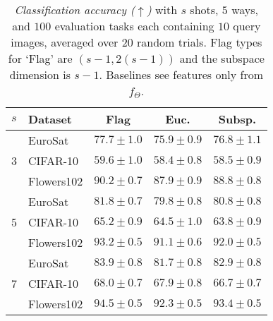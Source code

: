 \setlength{\tabcolsep}{10pt}
\begin{table}[ht]
    \centering
    \caption{\emph{Classification accuracy ($\uparrow$)} with $s$ shots, $5$ ways, and $100$ evaluation tasks each containing $10$ query images, averaged over $20$ random trials. Flag types for `Flag' are $(s-1,2(s-1))$ and the subspace dimension is $s-1$. Baselines see features only from $f_\Theta$.}
    \label{tab:fewshot_app2}
    \begin{tabular}{@{\hskip 4pt}l@{\hskip 4pt}l@{\hskip 4pt}c@{\hskip 7pt} c @{\hskip 7pt}c}
        \toprule
        $s$ & Dataset & Flag & Euc. & Subsp. \\
        \midrule
        \multirow{3}{*}{3} & EuroSat & $\bm{77.7} \pm 1.0$ & $75.9 \pm 0.9$ & $76.8 \pm 1.1$ \\
         & CIFAR-10 & $\bm{59.6} \pm 1.0$ & $58.4 \pm 0.8$ & $58.5 \pm 0.9$ \\
         & Flowers102 & $\bm{90.2} \pm 0.7$ & $87.9 \pm 0.9$ & $88.8 \pm 0.8$ \\
        \cline{1-5}
        \multirow{3}{*}{5} & EuroSat & $\bm{81.8} \pm 0.7$ & $79.8 \pm 0.8$ & $80.8 \pm 0.8$ \\
         & CIFAR-10 & $\bm{65.2} \pm 0.9$ & $64.5 \pm 1.0$ & $63.8 \pm 0.9$ \\
         & Flowers102 & $\bm{93.2} \pm 0.5$ & $91.1 \pm 0.6$ & $92.0 \pm 0.5$ \\
        \cline{1-5}
        \multirow{3}{*}{7} & EuroSat & $\bm{83.9} \pm 0.8$ & $81.7 \pm 0.8$ & $82.9 \pm 0.8$ \\
         & CIFAR-10 & $\bm{68.0} \pm 0.7$ & $67.9 \pm 0.8$ & $66.7 \pm 0.7$ \\
         & Flowers102 & $\bm{94.5} \pm 0.5$ & $92.3 \pm 0.5$ & $93.4 \pm 0.5$ \\
        \bottomrule
    \end{tabular}\vspace{-3mm}
\end{table}



